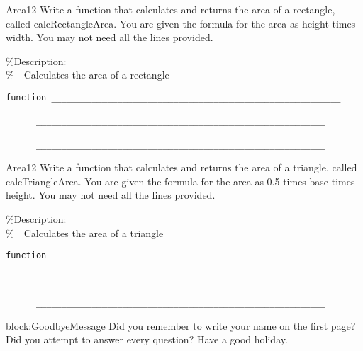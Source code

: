 \documentclass[master]{exam}
\begin{document}
\begin{problem}{Area}{12}
    \label{ca2} Write a function that
    calculates and returns the area of
    a rectangle,
    called calcRectangleArea. You
    are given the formula for the area as height times width. You may not
    need all the lines provided.

   
    \%Description:\\
    \%\ \ Calculates the area of a rectangle
    \begin{verbatim}function _________________________________________________________

      _________________________________________________________

      _________________________________________________________
    \end{verbatim}
\end{problem}


\begin{problem}{Area}{12}
    \label{ca3} Write a function that
    calculates and returns the area of
    a triangle,
    called calcTriangleArea. You
    are given the formula for the area as 0.5 times base times height. You may not
    need all the lines provided.

    \%Description:\\
    \%\ \ Calculates the area of a triangle
    \begin{verbatim}function _________________________________________________________

      _________________________________________________________

      _________________________________________________________
    \end{verbatim}
\end{problem}


\begin{block}{block:GoodbyeMessage}
  Did you remember to write your name on the first page?  Did you
  attempt to answer every question?    Have a good holiday.
\end{block}
\end{document}

